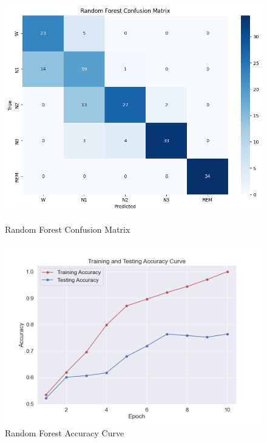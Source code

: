 \begin{figure}[H]
	\centering
	\begin{minipage}[b]{0.45\textwidth}
		\centering
		\includegraphics[width=\textwidth]{img/paper_1/random_forest_confusion_matrix.png}
		\caption{Random Forest Confusion Matrix}
	\end{minipage}
	\hfill
	\begin{minipage}[b]{0.45\textwidth}
		\centering
		\includegraphics[width=\textwidth]{img/paper_1/accuracy_curve.png}
		\caption{Random Forest Accuracy Curve}
	\end{minipage}
	
	\vspace{1em}
	

\end{figure}
